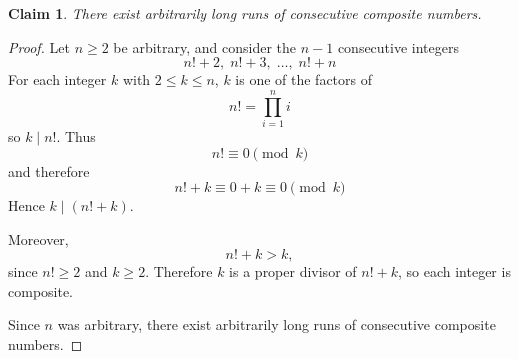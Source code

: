 \documentclass{article}
\newtheorem*{claim}{Claim}
\begin{document}
\begin{claim}
    There exist arbitrarily long runs of consecutive composite numbers.
\end{claim}

\begin{proof}
    Let $n \ge 2$ be arbitrary, and consider the $n-1$ consecutive integers
    \[
    n!+2,\; n!+3,\; \dots,\; n!+n
    \]
    For each integer $k$ with $2 \le k \le n$, $k$ is one of the factors of
    \[
    n! = \prod_{i=1}^{n} i
    \]
    so $k \mid n!$. Thus
    \[
    n! \equiv 0 \pmod{k}
    \]
    and therefore
    \[
    n! + k \equiv 0 + k \equiv 0 \pmod{k}
    \]
    Hence $k \mid (n!+k)$.

    \medskip

    Moreover,
    \[
    n!+k > k,
    \]
    since $n! \ge 2$ and $k \ge 2$. Therefore $k$ is a proper divisor of $n!+k$, so each integer 
    is composite.

    \medskip

    Since $n$ was arbitrary, there exist arbitrarily long runs of consecutive composite numbers.
\end{proof}
\end{document}
